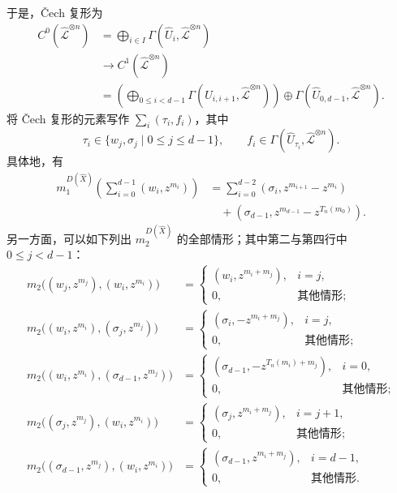 于是，\v{C}ech 复形为
\[
\begin{aligned}
C^0(\widehat{\mathcal L}^{\otimes n})
&=\bigoplus_{i\in I}\Gamma(\widehat U_i,\widehat{\mathcal L}^{\otimes n})\\
&\longrightarrow C^1(\widehat{\mathcal L}^{\otimes n})\\
&=\left(\bigoplus_{0\leq i<d-1}
\Gamma(\widehat U_{i,i+1},\widehat{\mathcal L}^{\otimes n})\right)
\oplus\Gamma(\widehat U_{0,d-1},\widehat{\mathcal L}^{\otimes n}).
\end{aligned}
\]
将 \v{C}ech 复形的元素写作 $\sum_i(\tau_i,f_i)$，其中
\[
\tau_i\in\{w_j,\sigma_j\mid0\leq j\leq d-1\},
\qquad
f_i\in\Gamma(\widehat U_{\tau_i},\widehat{\mathcal L}^{\otimes n}).
\]
具体地，有
\begin{equation}\label{eq:8.23}
\begin{aligned}
m_1^{D(\widehat X)}\left(\sum_{i=0}^{d-1}(w_i,z^{m_i})\right)
&=\sum_{i=0}^{d-2}(\sigma_i,z^{m_{i+1}}-z^{m_i})\\
&\quad +(\sigma_{d-1},z^{m_{d-1}}-z^{T_n(m_0)}).
\end{aligned}
\end{equation}
另一方面，可以如下列出 $m_2^{D(\widehat X)}$ 的全部情形；其中第二与第四行中 $0\leq j<d-1$：
\begin{equation}\label{eq:8.24}
\begin{aligned}
m_2\bigl((w_j,z^{m_j}),(w_i,z^{m_i})\bigr)
&=\begin{cases}(w_i,z^{m_i+m_j}),&i=j,\\0,&\text{其他情形};\end{cases}\\[2pt]
m_2\bigl((w_i,z^{m_i}),(\sigma_j,z^{m_j})\bigr)
&=\begin{cases}(\sigma_i,-z^{m_i+m_j}),&i=j,\\0,&\text{其他情形};\end{cases}\\[2pt]
m_2\bigl((w_i,z^{m_i}),(\sigma_{d-1},z^{m_j})\bigr)
&=\begin{cases}(\sigma_{d-1},-z^{T_n(m_i)+m_j}),&i=0,\\0,&\text{其他情形};\end{cases}\\[2pt]
m_2\bigl((\sigma_j,z^{m_j}),(w_i,z^{m_i})\bigr)
&=\begin{cases}(\sigma_j,z^{m_i+m_j}),&i=j+1,\\0,&\text{其他情形};\end{cases}\\[2pt]
m_2\bigl((\sigma_{d-1},z^{m_j}),(w_i,z^{m_i})\bigr)
&=\begin{cases}(\sigma_{d-1},z^{m_i+m_j}),&i=d-1,\\0,&\text{其他情形}.
\end{cases}
\end{aligned}
\end{equation}

